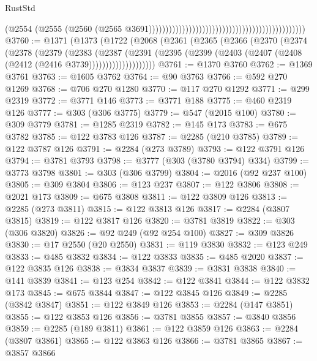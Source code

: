 \begin{lexlean}{RustStd}
\begin{coremodule}
{\begin{coremodule}
{{{{{{{{{{{{{{{{{{{{{{{{{{{{{{{{{{{{{{{{{{{{{{{{{{{{{{{{{{{{{{{{{{{{                                                                                          (@2554
                                                                                            (@2555
                                                                                              (@2560
                                                                                                (@2565
                                                                                                  @3691)))))))))))))))))))))))))))))))))))))))))))))))
@3760 := @1371
    (@1373
      (@1722
        (@2068
          (@2361
            (@2365
              (@2366
                (@2370
                  (@2374
                    (@2378
                      (@2379
                        (@2383
                          (@2387
                            (@2391
                              (@2395
                                (@2399 (@2403 (@2407 (@2408 (@2412 (@2416 @3739))))))))))))))))))))
@3761 := @1370 @3760
@3762 := @1369 @3761
@3763 := @1605 @3762
@3764 := @90 @3763
@3766 := @592 @270 @1269
@3768 := @706 @270 @1280
@3770 := @117 @270 @1292
@3771 := @299 @2319
@3772 := @3771 @146
@3773 := @3771 @188
@3775 := @460 @2319 @126
@3777 := @303 (@306 @3775)
@3779 := @547 (@2015 @100)
@3780 := @309 @3779
@3781 := @1285 @2319
@3782 := @145 @173
@3783 := @675 @3782
@3785 := @122 @3783 @126
@3787 := @2285 (@210 @3785)
@3789 := @122 @3787 @126
@3791 := @2284 (@273 @3789)
@3793 := @122 @3791 @126
@3794 := @3781 @3793
@3798 := @3777 (@303 (@3780 @3794) @334)
@3799 := @3773 @3798
@3801 := @303 (@306 @3799)
@3804 := @2016 (@92 @237 @100)
@3805 := @309 @3804
@3806 := @123 @237
@3807 := @122 @3806
@3808 := @2021 @173
@3809 := @675 @3808
@3811 := @122 @3809 @126
@3813 := @2285 (@273 @3811)
@3815 := @122 @3813 @126
@3817 := @2284 (@3807 @3815)
@3819 := @122 @3817 @126
@3820 := @3781 @3819
@3822 := @303 (@306 @3820)
@3826 := @92 @249 (@92 @254 @100)
@3827 := @309 @3826
@3830 := @17 @2550 (@20 @2550)
@3831 := @119 @3830
@3832 := @123 @249
@3833 := @485 @3832
@3834 := @122 @3833
@3835 := @485 @2020
@3837 := @122 @3835 @126
@3838 := @3834 @3837
@3839 := @3831 @3838
@3840 := @141 @3839
@3841 := @123 @254
@3842 := @122 @3841
@3844 := @122 @3832 @173
@3845 := @675 @3844
@3847 := @122 @3845 @126
@3849 := @2285 (@3842 @3847)
@3851 := @122 @3849 @126
@3853 := @2284 (@147 @3851)
@3855 := @122 @3853 @126
@3856 := @3781 @3855
@3857 := @3840 @3856
@3859 := @2285 (@189 @3811)
@3861 := @122 @3859 @126
@3863 := @2284 (@3807 @3861)
@3865 := @122 @3863 @126
@3866 := @3781 @3865
@3867 := @3857 @3866
}}}}}}}}}}}}}}}}}}}}}}}}}}}}}}}}}}}}}}}}}}}}}}}}}}}}}}}}}}}}}}}}}}}}
\end{coremodule}}
\end{coremodule}
\end{lexlean}

